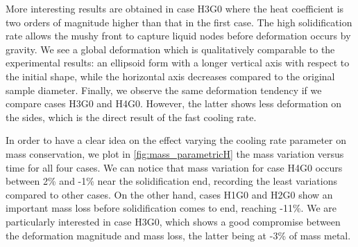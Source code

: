 More interesting results are obtained in case H3G0 where the heat coefficient is two orders of magnitude 
higher than that in the first case. The high solidification rate allows the mushy front 
to capture liquid nodes before deformation occurs by gravity. We see a global deformation which is qualitatively comparable to the experimental 
results: an ellipsoid form with a longer vertical axis with respect to the initial shape, while the horizontal axis decreases compared to the original
sample diameter. Finally, we observe the same deformation tendency if we compare cases H3G0 and H4G0. However, the latter shows less deformation
on the sides, which is the direct result of the fast cooling rate.

In order to have a clear idea on the effect varying the cooling rate parameter on mass conservation, we plot in \cref{fig:mass_parametricH}
the mass variation versus time for all four cases. We can notice that mass variation for case H4G0 occurs between 2\% and -1\% near the solidification end,
recording the least variations compared to other cases. On the other hand, cases H1G0 and H2G0 show an important mass loss before solidification comes to end,
reaching -11\%. We are particularly interested in case H3G0, which shows a good compromise between the deformation magnitude and mass loss, the latter being at -3\% of mass metal.


